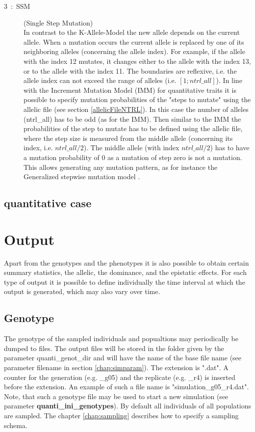 \documentclass[letterpaper,12pt,oneside]{book}
\begin{document}
\begin{description}
\begin{description}
\item[3~:~SSM] (Single Step Mutation)\\
In contrast to the K-Allele-Model the new allele depends on the current allele. When a mutation occurs the current allele is replaced by one of its neighboring alleles (concerning the allele index). For example, if the allele with the index 12 mutates, it changes either to the allele with the index 13, or to the allele with the index 11. The boundaries are reflexive, i.e. the allele index can not exceed the range of alleles (i.e. $[1; ntrl\_all]$). In line with the Increment Mutation Model (IMM) for quantitative traits it is possible to specify mutation probabilities of the "steps to mutate" using the allelic file (see section \ref{allelicFileNTRL}). In this case the number of alleles (\textsf{ntrl\_all}) has to be odd (as for the IMM). Then similar to the IMM the probabilities of the step to mutate has to be defined using the allelic file, where the step size is measured from the middle allele (concerning its index, i.e. $ntrl\_all/2$). The middle allele (with index $ntrl\_all/2$) has to have a mutation probability of 0 as a mutation of step zero is not a mutation. This allows generating any mutation pattern, as for instance the Generalized stepwise mutation model \citep{Estoup_2002}.
\end{description}
\end{description}

\subsection{quantitative case}





\section{Output}
Apart from the genotypes and the phenotypes it is also possible to obtain certain summary statistics, the allelic, the dominance, and the epistatic effects. For each type of output it is possible to define individually the time interval at which the output is generated, which may also vary over time.

\subsection{Genotype}\label{genoQuanti}
The genotype of the sampled individuals and popualtions may periodically be dumped to files. The output files will be stored in the folder given by the parameter \textsf{quanti\_genot\_dir} and will have the name of the base file name (see parameter \textsf{filename} in section \ref{chap:simparam}). The extension is ".dat". A counter for the generation (e.g. \_g05) and the replicate (e.g. \_r4) is inserted before the extension. An example of such a file name is \textsf{"simulation\_g05\_r4.dat"}. Note, that such a genotype file may be used to start a new simulation (see parameter \textbf{quanti\_ini\_genotypes}). By default all individuals of all populations are sampled. The chapter \ref{chap:sampling} describes how to specify a sampling schema.
\end{document}
